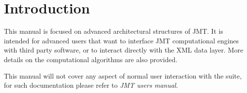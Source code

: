 %
%
%
%
%
\chapter{Introduction}
This manual is focused on advanced architectural structures of JMT.
It is intended for advanced users that want to interface JMT
computational engines with third party software, or to interact
directly with the XML data layer. More details on the computational
algorithms are also provided.

This manual will not cover any aspect of normal user interaction
with the suite, for such documentation please refer to \emph{JMT
users manual}.
